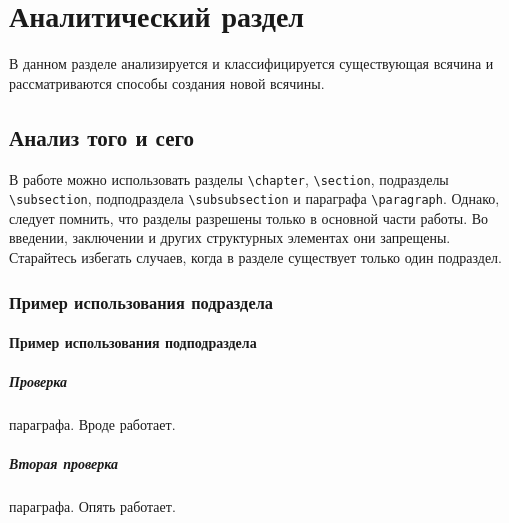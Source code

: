\chapter{Аналитический раздел}
\label{cha:analysis}


В данном разделе анализируется и классифицируется существующая всячина и рассматриваются способы создания новой всячины.

\section{Анализ того и сего}

В работе можно использовать разделы \verb|\chapter|, \verb|\section|, подразделы \verb|\subsection|, подподраздела \verb|\subsubsection| и параграфа \verb|\paragraph|. Однако, следует помнить, что разделы разрешены только в основной части работы. Во введении, заключении и других структурных элементах они запрещены. Старайтесь избегать случаев, когда в разделе существует только один подраздел.

\subsection{Пример использования подраздела}
\subsubsection{Пример использования подподраздела}

\paragraph{Проверка} параграфа. Вроде работает.
\paragraph{Вторая проверка} параграфа. Опять работает.


